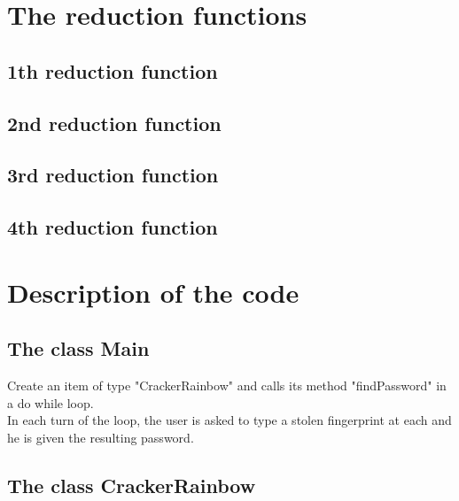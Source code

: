 \documentclass[11pt,a4paper]{article}
\begin{document}
\newpage
\section{The reduction functions}
\subsection{1th reduction function}
\subsection{2nd reduction function}
\subsection{3rd reduction function}
\subsection{4th reduction function}

\newpage
\section{Description of the code}

\subsection{The class Main}

Create an item of type "CrackerRainbow" and calls its method "findPassword" in a do while loop. \\
In each turn of the loop, the user is asked to type a stolen fingerprint at each and he is given the resulting password. \\



\subsection{The class CrackerRainbow}
\end{document}

